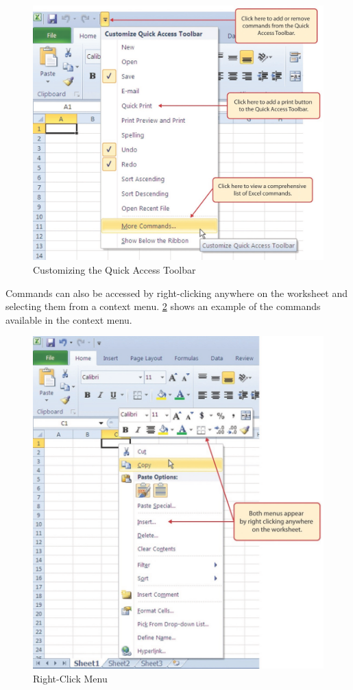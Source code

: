 \begin{figure}[H]
	\centering
	\includegraphics[width=\maxwidth{.95\linewidth}]{gfx/ch01_fig07}
	\caption{Customizing the Quick Access Toolbar}
	\label{01:fig07}
\end{figure}

Commands can also be accessed by right-clicking anywhere on the worksheet and selecting them from a context menu. \ref{01:fig08} shows an example of the commands available in the context menu.

\begin{figure}[H]
	\centering
	\includegraphics[width=\maxwidth{.95\linewidth}]{gfx/ch01_fig08}
	\caption{Right-Click Menu}
	\label{01:fig08}
\end{figure}


